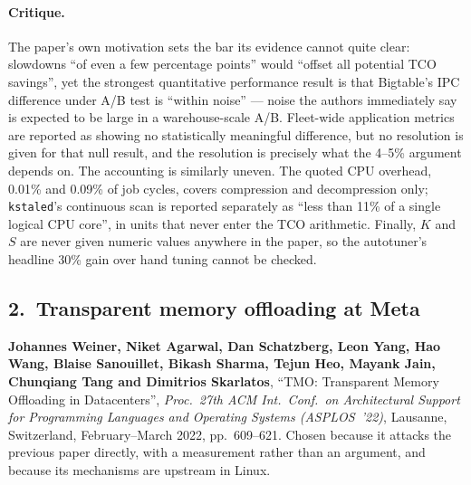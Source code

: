 \paragraph{Critique.}
The paper's own motivation sets the bar its evidence cannot quite clear: slowdowns ``of
even a few percentage points'' would ``offset all potential TCO savings'', yet the
strongest quantitative performance result is that Bigtable's IPC difference under A/B
test is ``within noise'' --- noise the authors immediately say is expected to be large in
a warehouse-scale A/B. Fleet-wide application metrics are reported as showing no
statistically meaningful difference, but no resolution is given for that null result, and
the resolution is precisely what the 4--5\% argument depends on. The accounting is
similarly uneven. The quoted CPU overhead, 0.01\% and 0.09\% of job cycles, covers
compression and decompression only; \texttt{kstaled}'s continuous scan is reported
separately as ``less than 11\% of a single logical CPU core'', in units that never enter
the TCO arithmetic. Finally, $K$ and $S$ are never given numeric values anywhere in the
paper, so the autotuner's headline 30\% gain over hand tuning cannot be checked.

\subsection*{2.~Transparent memory offloading at Meta}

\noindent\textbf{Johannes Weiner, Niket Agarwal, Dan Schatzberg, Leon Yang, Hao Wang,
Blaise Sanouillet, Bikash Sharma, Tejun Heo, Mayank Jain, Chunqiang Tang and Dimitrios
Skarlatos}, ``TMO: Transparent Memory Offloading in Datacenters'', \emph{Proc.\ 27th
ACM Int.\ Conf.\ on Architectural Support for Programming Languages and Operating
Systems (ASPLOS~'22)}, Lausanne, Switzerland, February--March 2022, pp.~609--621.
Chosen because it attacks the previous paper directly, with a measurement rather than an
argument, and because its mechanisms are upstream in Linux.

